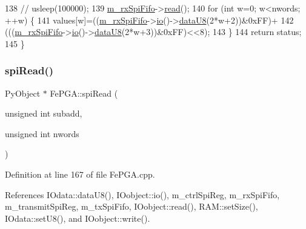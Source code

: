 \begin{DoxyCode}
138   \textcolor{comment}{//  usleep(100000);}
139   \hyperlink{classFePGA_a3ee7f973bfad39b48bbc1a185e9ffaec}{m\_rxSpiFifo}->\hyperlink{classIOobject_aa07610c11963b1db6710e3c76ceea456}{read}();
140   \textcolor{keywordflow}{for} (\textcolor{keywordtype}{int} w=0; w<nwords; ++w) \{
141     values[w]=((\hyperlink{classFePGA_a3ee7f973bfad39b48bbc1a185e9ffaec}{m\_rxSpiFifo}->\hyperlink{classIOobject_af04fb94137c3d86849f478ac5afab5d1}{io}()->\hyperlink{classIOdata_a75e9c318dbac3a39402179070943d4bc}{dataU8}(2*w+2))&0xFF)+
142       (((\hyperlink{classFePGA_a3ee7f973bfad39b48bbc1a185e9ffaec}{m\_rxSpiFifo}->\hyperlink{classIOobject_af04fb94137c3d86849f478ac5afab5d1}{io}()->\hyperlink{classIOdata_a75e9c318dbac3a39402179070943d4bc}{dataU8}(2*w+3))&0xFF)<<8);
143   \}
144   \textcolor{keywordflow}{return} status;
145 \}
\end{DoxyCode}
\mbox{\label{classFePGA_a41fb676237f8906ec5a0c1b9084ad33e}} 
\subsubsection{\texorpdfstring{spi\+Read()}{spiRead()}\hspace{0.1cm}{\footnotesize\ttfamily [2/3]}}
{\footnotesize\ttfamily Py\+Object $\ast$ Fe\+P\+G\+A\+::spi\+Read (\begin{DoxyParamCaption}\item[{unsigned int}]{subadd,  }\item[{unsigned int}]{nwords }\end{DoxyParamCaption})}



Definition at line 167 of file Fe\+P\+G\+A.\+cpp.



References I\+Odata\+::data\+U8(), I\+Oobject\+::io(), m\+\_\+ctrl\+Spi\+Reg, m\+\_\+rx\+Spi\+Fifo, m\+\_\+transmit\+Spi\+Reg, m\+\_\+tx\+Spi\+Fifo, I\+Oobject\+::read(), R\+A\+M\+::set\+Size(), I\+Odata\+::set\+U8(), and I\+Oobject\+::write().


